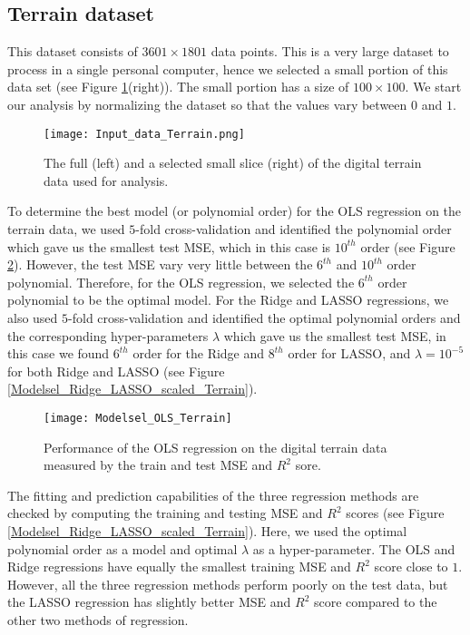 \documentclass[a4paper]{article}
\begin{document}
\subsection{Terrain dataset}
This dataset consists of $3601\times1801$ data points. This is a very large dataset to process in a single personal computer, hence we selected a small portion of this data set (see Figure \ref{Input_data_Terrain}(right)). The small portion has a size of $100\times100$. We start our analysis by normalizing the dataset so that the values vary between $0$ and $1$.
\begin{figure}
  \centering
  \texttt{[image: Input\_data\_Terrain.png]}
  \caption{The full (left) and a selected small slice (right) of the digital terrain data used for analysis.}
    \label{Input_data_Terrain}
\end{figure}
To determine the best model (or polynomial order) for the OLS regression on the terrain data, we used $5$-fold cross-validation and identified the polynomial order which gave us the smallest test MSE, which in this case is $10^{th}$ order (see Figure \ref{Modelsel_OLS_Terrain}). However, the test MSE vary very little between the $6^{th}$ and $10^{th}$ order polynomial. Therefore, for the OLS regression, we selected the $6^{th}$ order polynomial to be the optimal model. For the Ridge and LASSO regressions, we also used $5$-fold cross-validation and identified the optimal polynomial orders and the corresponding hyper-parameters $\lambda$ which gave us the smallest test MSE, in this case we found $6^{th}$ order for the Ridge and $8^{th}$ order for LASSO, and  $\lambda=10^{-5}$ for both Ridge and LASSO (see Figure \ref{Modelsel_Ridge_LASSO_scaled_Terrain}).

\begin{figure}[H]
  \centering
  \texttt{[image: Modelsel\_OLS\_Terrain]}
  \caption{Performance of the OLS regression on the digital terrain data measured by the train and test MSE and $R^2$ sore.}
    \label{Modelsel_OLS_Terrain}
\end{figure}

The fitting and prediction capabilities of the three regression methods are checked by computing the training and testing MSE and $R^2$ scores (see Figure \ref{Modelsel_Ridge_LASSO_scaled_Terrain}). Here, we used the optimal polynomial order as a model and optimal $\lambda$ as a hyper-parameter. The OLS and Ridge regressions have equally the smallest training MSE and $R^2$ score close to $1$. However, all the three regression methods perform poorly on the test data, but the LASSO regression has slightly better MSE and $R^2$ score compared to the other two methods of regression.
\end{document}
